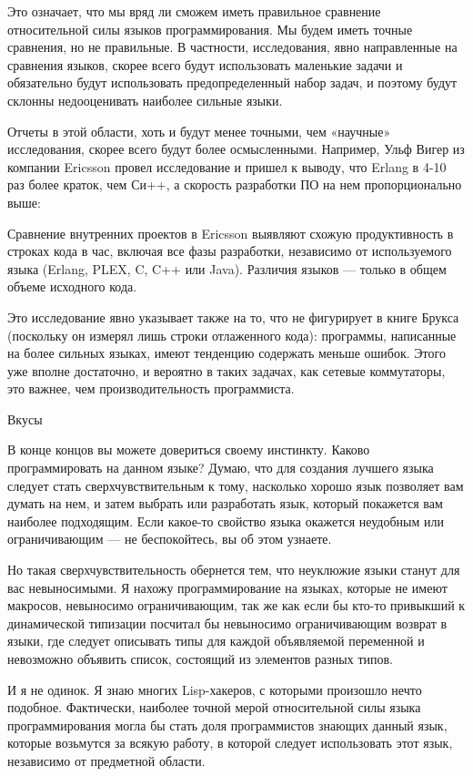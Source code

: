 \documentclass[ebook,12pt,oneside,openany]{memoir}
\begin{document}
Это означает, что мы вряд ли сможем иметь правильное сравнение
относительной силы языков программирования. Мы будем иметь точные
сравнения, но не правильные. В частности, исследования, явно
направленные на сравнения языков, скорее всего будут использовать
маленькие задачи и обязательно будут использовать предопределенный
набор задач, и поэтому будут склонны недооценивать наиболее сильные
языки.

Отчеты в этой области, хоть и будут менее точными, чем «научные»
исследования, скорее всего будут более осмысленными. Например, Ульф
Вигер из компании Ericsson провел исследование и пришел к выводу, что
Erlang в 4-10 раз более краток, чем Си++, а скорость разработки ПО на
нем пропорционально выше:

Сравнение внутренних проектов в Ericsson выявляют схожую
продуктивность в строках кода в час, включая все фазы разработки,
независимо от используемого языка (Erlang, PLEX, C, C++ или Java).
Различия языков — только в общем объеме исходного кода.


Это исследование явно указывает также на то, что не фигурирует в книге
Брукса (поскольку он измерял лишь строки отлаженного кода): программы,
написанные на более сильных языках, имеют тенденцию содержать меньше
ошибок. Этого уже вполне достаточно, и вероятно в таких задачах, как
сетевые коммутаторы, это важнее, чем производительность программиста.

Вкусы

В конце концов вы можете довериться своему инстинкту. Каково
программировать на данном языке? Думаю, что для создания лучшего языка
следует стать сверхчувствительным к тому, насколько хорошо язык
позволяет вам думать на нем, и затем выбрать или разработать язык,
который покажется вам наиболее подходящим. Если какое-то свойство
языка окажется неудобным или ограничивающим — не беспокойтесь, вы об
этом узнаете.

Но такая сверхчувствительность обернется тем, что неуклюжие языки
станут для вас невыносимыми. Я нахожу программирование на языках,
которые не имеют макросов, невыносимо ограничивающим, так же как если
бы кто-то привыкший к динамической типизации посчитал бы невыносимо
ограничивающим возврат в языки, где следует описывать типы для каждой
объявляемой переменной и невозможно объявить список, состоящий из
элементов разных типов.

И я не одинок. Я знаю многих Lisp-хакеров, с которыми произошло нечто
подобное. Фактически, наиболее точной мерой относительной силы языка
программирования могла бы стать доля программистов знающих данный
язык, которые возьмутся за всякую работу, в которой следует
использовать этот язык, независимо от предметной области.
\end{document}

